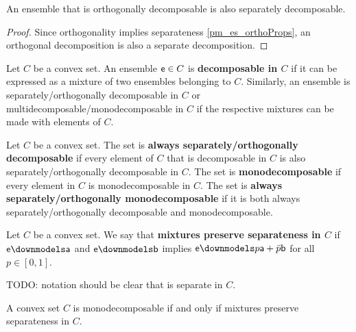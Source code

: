\begin{coro}
	An ensemble that is orthogonally decomposable is also separately decomposable.
\end{coro}

\begin{proof}
	Since orthogonality implies separateness \ref{pm_es_orthoProps}, an orthogonal decomposition is also a separate decomposition.
\end{proof}

\begin{prop}
	Let $C$ be a convex set. An ensemble $\mathsf{e} \in C$ is \textbf{decomposable in $C$} if it can be expressed as a mixture of two ensembles belonging to $C$. Similarly, an ensemble is separately/orthogonally decomposable in $C$ or multidecomposable/monodecomposable in $C$ if the respective mixtures can be made with elements of $C$.
\end{prop}

\begin{prop}
	Let $C$ be a convex set. The set is \textbf{always separately/orthogonally decomposable} if every element of $C$ that is decomposable in $C$ is also separately/orthogonally decomposable in $C$. The set is \textbf{monodecomposable} if every element in $C$ is monodecomposable in $C$. The set is \textbf{always separately/orthogonally monodecomposable} if it is both always separately/orthogonally decomposable and monodecomposable.
\end{prop}

\begin{defn}
	Let $C$ be a convex set. We say that \textbf{mixtures preserve separateness in $C$} if $\ens \separate \ens[a]$ and $\ens \separate \ens[b]$ implies $\ens \separate p \ens[a] + \bar{p} \ens[b]$ for all $p \in [0,1]$.
	
	TODO: notation should be clear that is separate in $C$.
\end{defn}

\begin{prop}
	A convex set $C$ is monodecomposable if and only if mixtures preserve separateness in $C$.
\end{prop}

